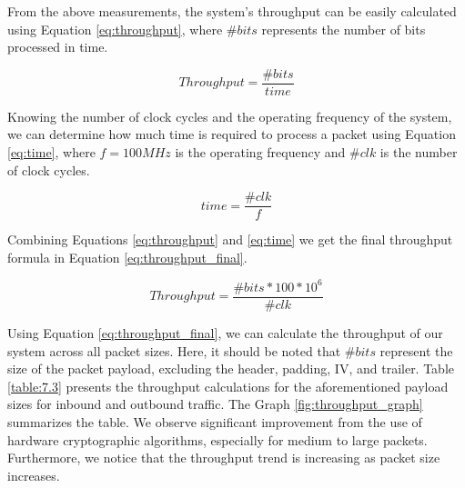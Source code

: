 From the above measurements, the system's throughput can be easily calculated using Equation \ref{eq:throughput}, where $\#bits$ represents the number of bits processed in time.

\begin{equation}\label{eq:throughput}
    Throughput = \frac{\#bits}{time }
\end{equation}

Knowing the number of clock cycles and the operating frequency of the system, we can determine how much time is required to process a packet using Equation \ref{eq:time}, where $f = 100MHz$ is the operating frequency and $\#clk$ is the number of clock cycles. 


\begin{equation}\label{eq:time}
    time = \frac{\#clk}{f}
\end{equation}


\noindent
Combining Equations \ref{eq:throughput} and \ref{eq:time} we get the final throughput formula in Equation \ref{eq:throughput_final}.

\begin{equation}\label{eq:throughput_final}
    Throughput=\frac{\#bits*100*10^6}{\#clk}
\end{equation}

Using Equation \ref{eq:throughput_final}, we can calculate the throughput of our system across all packet sizes. Here, it should be noted that $\#bits$ represent the size of the packet payload, excluding the header, padding, IV, and trailer. Table \ref{table:7.3} presents the throughput calculations for the aforementioned payload sizes for inbound and outbound traffic. The Graph \ref{fig:throughput_graph} summarizes the table. We observe significant improvement from the use of hardware cryptographic algorithms, especially for medium to large packets. Furthermore, we notice that the throughput trend is increasing as packet size increases.


